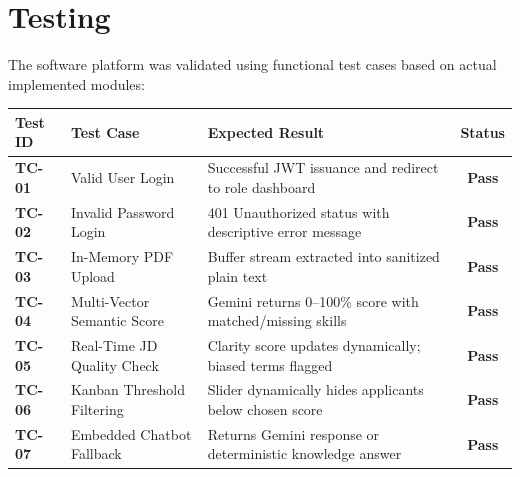\documentclass[12pt, a4paper]{article}
\begin{document}
\newpage

\section{Testing}
The software platform was validated using functional test cases based on actual implemented modules:

\vspace{0.2cm}
\begin{center}
\renewcommand{\arraystretch}{1.2}
\begin{tabularx}{\textwidth}{l p{3.8cm} p{6.0cm} c}
\toprule
\textbf{\color{primary}Test ID} & \textbf{\color{primary}Test Case} & \textbf{\color{primary}Expected Result} & \textbf{\color{primary}Status} \\
\midrule
\textbf{TC-01} & Valid User Login & Successful JWT issuance and redirect to role dashboard & \textbf{Pass} \\
\textbf{TC-02} & Invalid Password Login & 401 Unauthorized status with descriptive error message & \textbf{Pass} \\
\textbf{TC-03} & In-Memory PDF Upload & Buffer stream extracted into sanitized plain text & \textbf{Pass} \\
\textbf{TC-04} & Multi-Vector Semantic Score & Gemini returns 0--100\% score with matched/missing skills & \textbf{Pass} \\
\textbf{TC-05} & Real-Time JD Quality Check & Clarity score updates dynamically; biased terms flagged & \textbf{Pass} \\
\textbf{TC-06} & Kanban Threshold Filtering & Slider dynamically hides applicants below chosen score & \textbf{Pass} \\
\textbf{TC-07} & Embedded Chatbot Fallback & Returns Gemini response or deterministic knowledge answer & \textbf{Pass} \\
\bottomrule
\end{tabularx}
\end{center}

\end{document}
